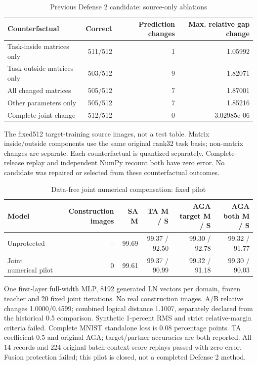 \begin{table}[!htbp]
\centering
\small
\caption{Previous Defense 2 candidate: source-only ablations}
\label{tab:ablation}
\begin{tabular}{lrrr}
\toprule
Counterfactual & Correct & Prediction changes & Max. relative gap change \\
\midrule
Task-inside matrices only & 511/512 & 1 & 1.05992 \\
Task-outside matrices only & 503/512 & 9 & 1.82071 \\
All changed matrices & 505/512 & 7 & 1.87001 \\
Other parameters only & 505/512 & 7 & 1.85216 \\
Complete joint change & 512/512 & 0 & 3.02985e-06 \\
\bottomrule
\end{tabular}
\par\vspace{3pt}\begin{minipage}{0.98\linewidth}\footnotesize The fixed512 target-training source images, not a test table. Matrix inside/outside components use the same original rank32 task basis; non-matrix changes are separate. Each counterfactual is quantized separately. Complete-release replay and independent NumPy recount both have zero error. No candidate was repaired or selected from these counterfactual outcomes.\end{minipage}
\end{table}

\begin{table}[!htbp]
\centering
\small
\caption{Data-free joint numerical compensation: fixed pilot}
\label{tab:data_free_joint}
\begin{tabular}{lrrrrr}
\toprule
Model & Construction images & SA M & TA M / S & AGA target M / S & AGA both M / S \\
\midrule
Unprotected & -- & 99.69 & 99.37 / 92.50 & 99.30 / 92.78 & 99.32 / 91.77 \\
Joint numerical pilot & 0 & 99.61 & 99.37 / 90.99 & 99.32 / 91.18 & 99.30 / 90.03 \\
\bottomrule
\end{tabular}
\par\vspace{3pt}\begin{minipage}{0.98\linewidth}\footnotesize One first-layer full-width MLP, 8192 generated LN vectors per domain, frozen teacher and 20 fixed joint iterations. No real construction images. A/B relative changes 1.0000/0.4599; combined logical distance 1.1007, separately declared from the historical 0.5 comparison. Synthetic 1-percent RMS and strict relative-margin criteria failed. Complete MNIST standalone loss is 0.08 percentage points. TA coefficient 0.5 and original AGA; target/partner accuracies are both reported. All 14 records and 224 original batch-context score replays passed with zero error. Fusion protection failed; this pilot is closed, not a completed Defense 2 method.\end{minipage}
\end{table}

